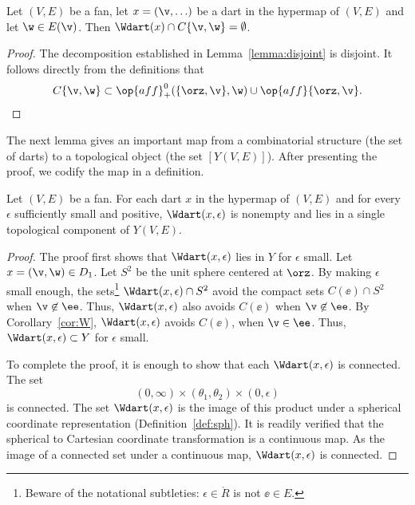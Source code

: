 \begin{corollary}[disjointness]\label{cor:W}
  Let $(V,E)$ be a fan, let $x = (\v,\ldots)$ be a dart in the
  hypermap of $(V,E)$ and let $\w\in E(\v)$.  Then $\Wdart(x)\cap
  C\{\v,\w\}=\emptyset$.
\end{corollary}

\begin{proof} The decomposition established in
  Lemma~\ref{lemma:disjoint} is disjoint.  It follows directly from
  the definitions that
\[ C\{\v,\w\}\subset \op{aff}_+^0(\{\orz,\v\},\w) \cup 
\op{aff}\{\orz,\v\}.\] 
\end{proof}

The next lemma gives an important map from a combinatorial structure (the
set of darts) to a topological object  (the set $[Y(V,E)]$).  After presenting the
proof, we  codify the map in a definition.

\begin{lemma} 
Let $(V,E)$ be a fan.
For each dart $x$ in the hypermap of $(V,E)$
and for every $\epsilon$ sufficiently small and positive,
$\Wdart(x,\epsilon)$ is nonempty and lies in a single 
topological component of $Y(V,E)$.
\end{lemma}
%
%

\begin{proof} The proof first shows that $\Wdart(x,\epsilon)$ lies in
  $Y$ for $\epsilon$ small.  Let $x=(\v,\w)\in D_1$.  Let $S^2$ be
  the unit sphere centered at $\orz$.  By making $\epsilon$ small
  enough, the sets\footnote{Beware of the notational subtleties:
    $\epsilon\in\ring{R}$ is not $\ee\in E$.}  $\Wdart(x,\epsilon)\cap
  S^2$ avoid the compact sets $C(\ee)\cap S^2$ when $\v\not\in \ee$.
  Thus, $\Wdart(x,\epsilon)$ also avoids $C(\ee)$ when $\v\not\in
  \ee$.  By Corollary~\ref{cor:W}, $\Wdart(x,\epsilon)$ avoids
  $C(\ee)$, when $\v\in \ee$.  Thus, $\Wdart(x,\epsilon)\subset Y$ for $\epsilon$ small.

To complete the proof, it is enough to show that each
$\Wdart(x,\epsilon)$ is connected.  The set
\[ 
(0,\infty) \times (\theta_1,\theta_2) \times (0,\epsilon)
\] 
is connected.  The set $\Wdart(x,\epsilon)$ is the image of this
product under a spherical coordinate representation
(Definition~\ref{def:sph}).  %
It is readily verified that the spherical to Cartesian coordinate
transformation is a continuous map. As the image of a connected set
under a continuous map, $\Wdart(x,\epsilon)$ is connected.
\end{proof}
%
%



